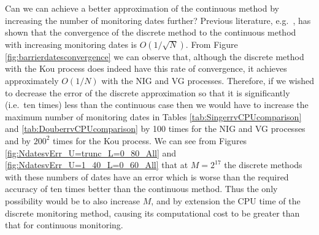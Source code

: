 \documentclass[11pt,a4paper]{article}
\begin{document}

Can we can achieve a better approximation of the continuous method by increasing the number of monitoring dates further? Previous literature, e.g.\ \cite{Green2010}, has shown that the convergence of the discrete method to the continuous method with increasing monitoring dates is $O(1/\sqrt{N})$. From Figure \ref{fig:barrierdatesconvergence} we can observe that, although the discrete method with the Kou process does indeed have this rate of convergence, it achieves approximately $O(1/N)$ with the NIG and VG processes. Therefore, if we wished to decrease the error of the discrete approximation so that it is significantly (i.e.\ ten times) less than the continuous case then we would have to increase the maximum number of monitoring dates in Tables \ref{tab:SingerrvCPUcomparison} and \ref{tab:DouberrvCPUcomparison} by 100 times for the NIG and VG processes and by $200^2$ times for the Kou process. We can see from Figures \ref{fig:NdatesvErr_U=trunc_L=0_80_All} and \ref{fig:NdatesvErr_U=1_40_L=0_60_All} that at $M=2^{17}$ the discrete methods with these numbers of dates have an error which is worse than the required accuracy of ten times better than the continuous method. Thus the only possibility would be to also increase $M$, and by extension the CPU time of the discrete monitoring method, causing its computational cost to be greater than that for continuous monitoring.
\end{document}

